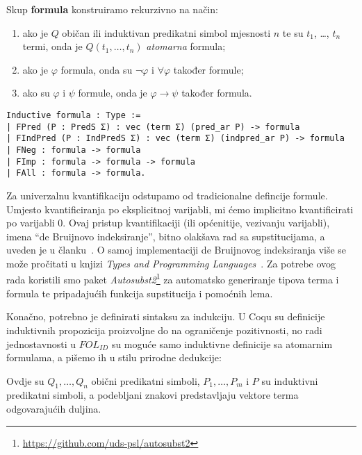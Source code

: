 \begin{definition}\label{def:formula}
  Skup \textbf{formula} konstruiramo rekurzivno na način:
  \begin{enumerate}
  \item ako je \(Q\) običan ili induktivan predikatni simbol mjesnosti \(n\) te su \(t_{1}\), \ldots, \(t_{n}\) termi,
    onda je \(Q(t_{1}, \ldots, t_{n})\) \textit{atomarna} formula;
  \item ako je \(\varphi\) formula, onda su \(\neg\varphi\) i \(\forall\varphi\) također formule;
  \item ako su \(\varphi\) i \(\psi\) formule, onda je \(\varphi \rightarrow \psi\) također formula.
  \end{enumerate}
\begin{verbatim}
Inductive formula : Type :=
| FPred (P : PredS Σ) : vec (term Σ) (pred_ar P) -> formula 
| FIndPred (P : IndPredS Σ) : vec (term Σ) (indpred_ar P) -> formula 
| FNeg : formula -> formula 
| FImp : formula -> formula -> formula 
| FAll : formula -> formula.
\end{verbatim}
\end{definition}
\noindent Za univerzalnu kvantifikaciju odstupamo od tradicionalne defincije formule.
Umjesto kvantificiranja po eksplicitnoj varijabli,
mi ćemo implicitno kvantificirati po varijabli \(0\).
Ovaj pristup kvantifikaciji (ili općenitije, vezivanju varijabli), imena ``de Bruijnovo indeksiranje'', bitno olakšava rad sa supstitucijama, a uveden je u članku~\cite{debruijnamelessdummies}.
O samoj implementaciji de Bruijnovog indeksiranja više se može pročitati u knjizi
\textit{Types and Programming Languages}~\cite{pierce2002tapl}.
Za potrebe ovog rada koristili smo paket \textit{Autosubst2}\footnote{\url{https://github.com/uds-psl/autosubst2}} za automatsko generiranje tipova terma i formula te
pripadajućih funkcija supstitucija i pomoćnih lema.


Konačno, potrebno je definirati sintaksu za indukciju.
U Coqu su definicije induktivnih propozicija proizvoljne do na ograničenje pozitivnosti,
no radi jednostavnosti u \(\mathit{FOL_{ID}}\) su moguće samo
induktivne definicije sa atomarnim formulama, a pišemo ih u stilu prirodne dedukcije:
\begin{prooftree}
\end{prooftree}
\noindent Ovdje su \(Q_{1}, \ldots, Q_{n}\) obični predikatni simboli, \(P_{1}, \ldots, P_{m}\) i \(P\) su induktivni predikatni simboli,
a podebljani znakovi predstavljaju vektore terma odgovarajućih duljina.

